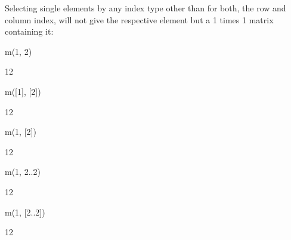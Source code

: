 {{{{{{{{{{{{{{{{{{\begin{xtc}
\begin{xtccomment}
Selecting single elements by any index type other than 
for both, the row and column index, will not give the respective element but
a 1 times 1 matrix containing it:
\end{xtccomment}
\begin{spadsrc}
m(1, 2) 
\end{spadsrc}
\begin{TeXOutput}
\begin{fricasmath}{5}
12%
\end{fricasmath}
\end{TeXOutput}
\begin{spadsrc}
m([1], [2]) 
\end{spadsrc}
\begin{TeXOutput}
\begin{fricasmath}{6}
\begin{MATRIX}{1}12\end{MATRIX}%
\end{fricasmath}
\end{TeXOutput}
\begin{spadsrc}
m(1, [2]) 
\end{spadsrc}
\begin{TeXOutput}
\begin{fricasmath}{7}
\begin{MATRIX}{1}12\end{MATRIX}%
\end{fricasmath}
\end{TeXOutput}
\begin{spadsrc}
m(1, 2..2) 
\end{spadsrc}
\begin{TeXOutput}
\begin{fricasmath}{8}
\begin{MATRIX}{1}12\end{MATRIX}%
\end{fricasmath}
\end{TeXOutput}
\begin{spadsrc}
m(1, [2..2]) 
\end{spadsrc}
\begin{TeXOutput}
\begin{fricasmath}{9}
\begin{MATRIX}{1}12\end{MATRIX}%
\end{fricasmath}
\end{TeXOutput}
\end{xtc}

}}}}}}}}}}}}}}}}}}
